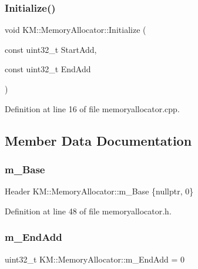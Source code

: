 \subsubsection{\texorpdfstring{Initialize()}{Initialize()}}
{\footnotesize\ttfamily void K\+M\+::\+Memory\+Allocator\+::\+Initialize (\begin{DoxyParamCaption}\item[{const uint32\+\_\+t}]{Start\+Add,  }\item[{const uint32\+\_\+t}]{End\+Add }\end{DoxyParamCaption})}



Definition at line 16 of file memoryallocator.\+cpp.



\subsection{Member Data Documentation}
\mbox{\label{class_k_m_1_1_memory_allocator_aa69b432479e7d67731ff420ce9b904a4}} 
\subsubsection{\texorpdfstring{m\+\_\+\+Base}{m\_Base}}
{\footnotesize\ttfamily Header K\+M\+::\+Memory\+Allocator\+::m\+\_\+\+Base \{nullptr, 0\}}



Definition at line 48 of file memoryallocator.\+h.

\mbox{\label{class_k_m_1_1_memory_allocator_aebd2cb25d4536312f915b1d65d724934}} 
\subsubsection{\texorpdfstring{m\+\_\+\+End\+Add}{m\_EndAdd}}
{\footnotesize\ttfamily uint32\+\_\+t K\+M\+::\+Memory\+Allocator\+::m\+\_\+\+End\+Add = 0}



